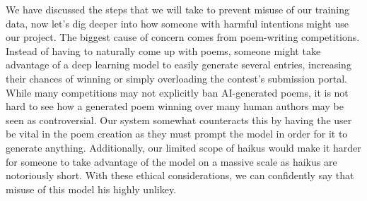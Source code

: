 \documentclass{article} %
\begin{document}
We have discussed the steps that we will take to prevent misuse of our training data, now let's dig deeper into how someone with harmful intentions might use our project.
The biggest cause of concern comes from poem-writing competitions.
Instead of having to naturally come up with poems, someone might take advantage of a deep learning model to easily generate several entries, increasing their chances of winning or simply overloading the contest's submission portal.
While many competitions may not explicitly ban AI-generated poems, it is not hard to see how a generated poem winning over many human authors may be seen as controversial.
Our system somewhat counteracts this by having the user be vital in the poem creation as they must prompt the model in order for it to generate anything.
Additionally, our limited scope of haikus would make it harder for someone to take advantage of the model on a massive scale as haikus are notoriously short.
With these ethical considerations, we can confidently say that misuse of this model his highly unlikey.


\pagebreak

\label{last_page}



\end{document}
